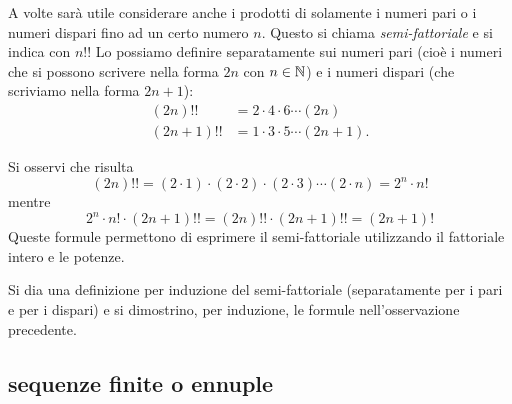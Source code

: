   A volte sarà utile considerare anche i prodotti di solamente i numeri
  pari o i numeri dispari fino ad un certo numero $n$. Questo
  si chiama \emph{semi-fattoriale}%
%
 e si indica con $n!!$
  Lo possiamo definire separatamente sui numeri pari (cioè 
  i numeri che si possono scrivere nella forma $2n$ con $n\in {\mathbb N}$)
  e i numeri dispari (che scriviamo nella forma $2n+1$):
  \begin{align*}
    (2n)!! &= 2 \cdot 4 \cdot 6 \cdots (2n) \\
    (2n+1)!! &= 1 \cdot 3 \cdot 5 \cdots (2n+1).
  \end{align*}
  
  \begin{remark}
  \label{rem:doppio_fattoriale}%
  Si osservi che risulta
  \[
    (2n)!! = (2\cdot 1) \cdot (2\cdot 2) \cdot (2\cdot 3) \cdots (2\cdot n)
          = 2^n \cdot n!
  \]
  mentre
  \[
    2^n \cdot n! \cdot (2n+1)!! 
    = (2n)!! \cdot (2n+1)!!
    = (2n+1)!
  \]
  Queste formule permettono di esprimere il semi-fattoriale utilizzando
  il fattoriale intero e le potenze.
  \end{remark}
  
\begin{exercise}
  Si dia una definizione per induzione del semi-fattoriale
  (separatamente per i pari e per i dispari)
  e si dimostrino, per induzione, le formule nell'osservazione precedente.
\end{exercise}


\subsection{sequenze finite o ennuple}
%
%

